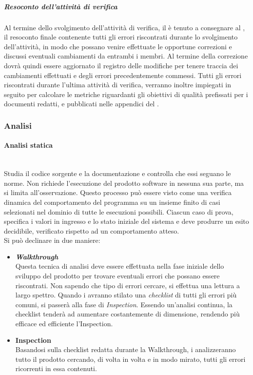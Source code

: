 \subparagraph{Resoconto dell'attività di verifica}
Al termine dello svolgimento dell'attività di verifica, il \ver{} è tenuto a consegnare al \RdP{}, il resoconto finale contenente tutti gli errori riscontrati durante lo svolgimento dell'attività, in modo che possano venire effettuate le opportune correzioni e discussi eventuali cambiamenti da entrambi i membri. Al termine della correzione dovrà quindi essere aggiornato il registro delle modifiche per tenere traccia dei cambiamenti effettuati e degli errori precedentemente commessi.
Tutti gli errori riscontrati durante l'ultima attività di verifica, verranno inoltre impiegati in seguito per calcolare le metriche riguardanti gli obiettivi di qualità prefissati per i documenti redatti, e pubblicati nelle appendici del \PdQ{}.


	\subsubsection{Analisi}
	\paragraph{Analisi statica}
	~\\Studia il codice sorgente e la documentazione e controlla che essi seguano le norme. Non richiede l'esecuzione del prodotto software in nessuna sua parte, ma si limita all'osservazione. Questo processo può essere visto come una verifica dinamica del comportamento del programma su un insieme finito di casi selezionati nel dominio di tutte le esecuzioni possibili. Ciascun caso di prova, specifica i valori in ingresso e lo stato iniziale del sistema e deve produrre un esito decidibile, verificato rispetto ad un comportamento atteso. 
	\\Si può declinare in due maniere:
	\begin{itemize}
		\item \textbf{\emph{Walkthrough}}
		~\\Questa tecnica di analisi deve essere effettuata nella fase iniziale dello sviluppo del prodotto per trovare eventuali errori che possano essere riscontrati. Non sapendo che tipo di errori cercare, si effettua una lettura a largo spettro. Quando i \vers{} avranno stilato una \emph{checklist} di tutti gli errori più comuni, si passerà alla fase di \emph{Inspection}. Essendo un'analisi continua, la checklist tenderà ad aumentare costantemente di dimensione, rendendo più efficace ed efficiente l'Inspection.
		\item \textbf{Inspection}
		~\\Basandosi sulla checklist redatta durante la Walkthrough, i \vers{} analizzeranno tutto il prodotto cercando, di volta in volta e in modo mirato, tutti gli errori ricorrenti in essa contenuti.
	\end{itemize}
